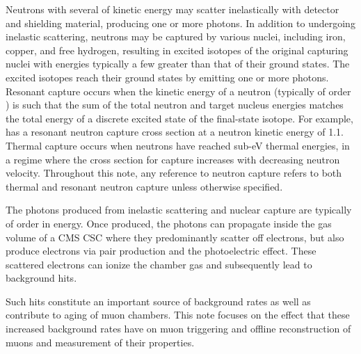 Neutrons with several \MeVns of kinetic energy may scatter inelastically with detector and shielding material, producing one or more photons. In addition to undergoing inelastic scattering, neutrons may be captured by various nuclei, including iron, copper, and free hydrogen, resulting in excited isotopes of the original capturing nuclei with energies typically a few \MeVns greater than that of their ground states. The excited isotopes reach their ground states by emitting one or more photons. Resonant capture occurs when the kinetic energy of a neutron (typically of order \keVns) is such that the sum of the total neutron and target nucleus energies matches the total energy of a discrete excited state of the final-state isotope. For example,  has a resonant neutron capture cross section at a neutron kinetic energy of 1.1\keV \cite{Kopecky:1997}. Thermal capture occurs when neutrons have reached sub-eV thermal energies, in a regime where the cross section for capture increases with decreasing neutron velocity. Throughout this note, any reference to neutron capture refers to both thermal and resonant neutron capture unless otherwise specified. 

The photons produced from inelastic scattering and nuclear capture are typically of order \MeVns in energy. Once produced, the photons can propagate inside the gas volume of a CMS CSC where they predominantly scatter off electrons, but also produce electrons via pair production and the photoelectric effect. These scattered electrons can ionize the chamber gas and subsequently lead to background hits.

Such hits constitute an important source of background rates as well as contribute to aging of muon chambers. This note focuses on the effect that these increased background rates have on muon triggering and offline reconstruction of muons and measurement of their properties. 

